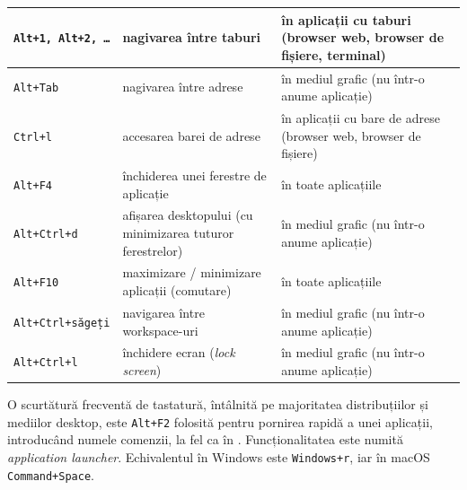\begin{table}[!htb]
{\begin{center}
\begin{tabular}{ p{} p{} p{} }
        \texttt{Alt+1, Alt+2, \ldots} &
        nagivarea între taburi &
        în aplicații cu taburi (browser web, browser de fișiere, terminal) \\
        \midrule

        \texttt{Alt+Tab} &
        nagivarea între adrese &
        în mediul grafic (nu într-o anume aplicație) \\
        \midrule

        \texttt{Ctrl+l} &
        accesarea barei de adrese &
        în aplicații cu bare de adrese (browser web, browser de fișiere) \\
        \midrule

        \texttt{Alt+F4} &
        închiderea unei ferestre de aplicație &
        în toate aplicațiile \\
        \midrule

        \texttt{Alt+Ctrl+d} &
        afișarea desktopului (cu minimizarea tuturor ferestrelor) &
        în mediul grafic (nu într-o anume aplicație) \\
        \midrule

        \texttt{Alt+F10} &
        maximizare / minimizare aplicații (comutare) &
        în toate aplicațiile \\
        \midrule

        \texttt{Alt+Ctrl+săgeți} &
        navigarea între workspace-uri &
        în mediul grafic (nu într-o anume aplicație) \\
        \midrule

        \texttt{Alt+Ctrl+l} &
        închidere ecran (\textit{lock screen}) &
        în mediul grafic (nu într-o anume aplicație) \\

      \bottomrule
    \end{tabular}
    \label{tab:ui:vm-shortcuts}
  \end{center}
  }
\end{table}

O scurtătură frecventă de tastatură, întâlnită pe majoritatea distribuțiilor și mediilor desktop, este \texttt{Alt+F2} folosită pentru pornirea rapidă a unei aplicații, introducând numele comenzii, la fel ca în . Funcționalitatea este numită \textit{application launcher}. Echivalentul în Windows este \texttt{Windows+r}, iar în macOS \texttt{Command+Space}.


